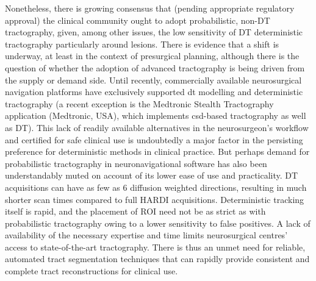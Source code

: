 Nonetheless, there is growing consensus that (pending appropriate regulatory approval) the clinical community ought to adopt probabilistic, non-DT tractography,\autocite{Yang2021, Beare2022, Petersen2017} given, among other issues, the low sensitivity of DT deterministic tractography particularly around lesions.\autocite{Ashmore2020}
There is evidence that a shift is underway, at least in the context of presurgical planning,\autocite{Toescu2020} although there is the question of whether the adoption of advanced tractography is being driven from the supply or demand side.
Until recently, commercially available neurosurgical navigation platforms have exclusively supported \gls{dt} modelling and deterministic tractography (a recent exception is the Medtronic Stealth\texttrademark{}  Tractography application (Medtronic, USA), which implements \gls{csd}-based tractography\autocite{Pozzilli2023} as well as DT).
This lack of readily available alternatives in the neurosurgeon's workflow and certified for safe clinical use is undoubtedly a major factor in the persisting preference for deterministic methods in clinical practice.
But perhaps demand for probabilistic tractography in neuronavigational software has also been understandably muted on account of its lower ease of use and practicality.
DT acquisitions can have as few as 6 diffusion weighted directions, resulting in much shorter scan times compared to full HARDI acquisitions.
Deterministic tracking itself is rapid, and the placement of ROI need not be as strict as with probabilistic tractography owing to a lower sensitivity to false positives.\autocite{ODonnell2017}
A lack of availability of the necessary expertise and time limits neurosurgical centres' access to state-of-the-art tractography.\autocite{Toescu2020}
There is thus an unmet need for reliable, automated tract segmentation techniques that can rapidly provide consistent and complete tract reconstructions for clinical use.
